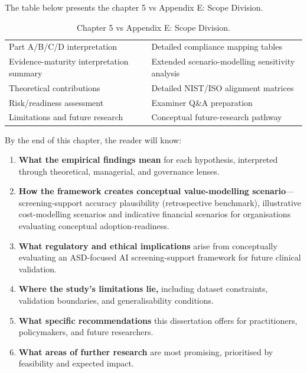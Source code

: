 \noindent The table below presents the chapter 5 vs Appendix E: Scope Division.

\begin{table}[H]
\centering
\caption{Chapter 5 vs Appendix E: Scope Division.}
\tablestripes\tablefontsize
\begin{tabularx}{\textwidth}{@{} L L @{}}
\toprule
{} &  \\
\midrule
Part A/B/C/D interpretation & Detailed compliance mapping tables \\
\addlinespace
Evidence-maturity interpretation summary & Extended scenario-modelling sensitivity analysis \\
\addlinespace
Theoretical contributions & Detailed NIST/ISO alignment matrices \\
\addlinespace
Risk/readiness assessment & Examiner Q\&A preparation \\
\addlinespace
Limitations and future research & Conceptual future-research pathway \\
\bottomrule
\end{tabularx}
\end{table}


By the end of this chapter, the reader will know:

\begin{enumerate}[label=(\alph*)]
    \item \textbf{What the empirical findings mean} for each hypothesis, interpreted through theoretical, managerial, and governance lenses.
    \item \textbf{How the framework creates conceptual value-modelling scenario}---screening-support accuracy plausibility (retrospective benchmark), illustrative cost-modelling scenarios and indicative financial scenarios for organisations evaluating conceptual adoption-readiness.
    \item \textbf{What regulatory and ethical implications} arise from conceptually evaluating an ASD-focused AI screening-support framework for future clinical validation.
    \item \textbf{Where the study's limitations lie,} including dataset constraints, validation boundaries, and generalisability conditions.
    \item \textbf{What specific recommendations} this dissertation offers for practitioners, policymakers, and future researchers.
    \item \textbf{What areas of further research} are most promising, prioritised by feasibility and expected impact.
\end{enumerate}

